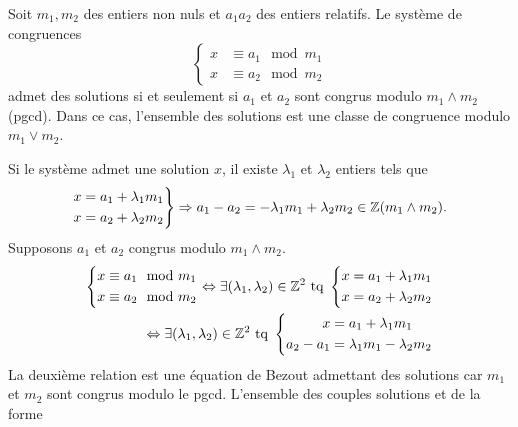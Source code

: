 \begin{propn}
  Soit $m_1, m_2$ des entiers non nuls et $a_1 a_2$ des entiers relatifs. Le système de congruences
  \begin{displaymath}
    \left\lbrace 
      \begin{align*}
        x &\equiv a_1 \mod m_1 \\
        x &\equiv a_2 \mod m_2
      \end{align*}
    \right.
  \end{displaymath}
  admet des solutions si et seulement si $a_1$ et $a_2$ sont congrus modulo $m_1 \wedge m_2$ (pgcd). Dans ce cas, l'ensemble des solutions est une classe de congruence modulo $m_1 \vee m_2$.
\end{propn}
\begin{demo}
  Si le système admet une solution $x$, il existe $\lambda_1$ et $\lambda_2$ entiers tels que 
  \begin{displaymath}
    \left. 
    \begin{aligned}
      x &= a_1 + \lambda_1 m_1 \\
      x &= a_2 + \lambda_2 m_2
    \end{aligned}
    \right \rbrace \Rightarrow
    a_1 - a_2 = -\lambda_1 m_1 + \lambda_2 m_2 \in \mathbb{Z} (m_1 \wedge m_2).
  \end{displaymath}
  Supposons $a_1$ et $a_2$ congrus modulo $m_1 \wedge m_2$.
  \begin{align*}
        \left\lbrace 
      \begin{aligned}
        x &\equiv a_1 \mod m_1 \\
        x &\equiv a_2 \mod m_2
      \end{aligned}
    \right.
    \Leftrightarrow \exists (\lambda_1, \lambda_2) \in \mathbb{Z}^2 \text{ tq }
            \left\lbrace 
      \begin{aligned}
        x &= a_1 + \lambda_1 m_1 \\
        x &= a_2 + \lambda_2 m_2
      \end{aligned}
    \right. \\
    \Leftrightarrow \exists (\lambda_1, \lambda_2) \in \mathbb{Z}^2 \text{ tq }
            \left\lbrace 
      \begin{aligned}
        x &= a_1 + \lambda_1 m_1 \\
        a_2 - a_1 &= \lambda_1 m_1 - \lambda_2 m_2
      \end{aligned}
    \right.
  \end{align*}
  La deuxième relation est une équation de Bezout admettant des solutions car $m_1$ et $m_2$ sont congrus modulo le pgcd. L'ensemble des couples solutions et de la forme

\end{demo}
